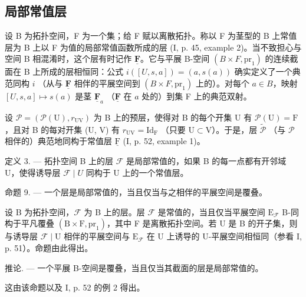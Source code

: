 \subsection{局部常值层}

设 B 为拓扑空间，F 为一个集；给 F 赋以离散拓扑。称以 F 为茎型的 B 上常值层为 B 上以 F 为值的局部常值函数所成的层 (I, p. 45, example 2)。当不致担心与空间 B 相混淆时，这个层有时记作 \(\underline{\mathbf{F}}\)。它与平展 B-空间 \((B \times F,\mathrm{pr}_1)\) 的连续截面在 B 上所成的层相恒同：公式 \(i([U,s,a]) = (a,s(a))\) 确实定义了一个典范同构 \(i\) （从与 \(\underline{\mathbf{F}}\) 相伴的平展空间到 \((B \times F,\mathrm{pr}_1)\) 上的）。对每个 \(a \in B\)，映射 \([U,s,a] \mapsto s(a)\) 是茎 \(\underline{\mathbf{F}}_a\) （\(\underline{\mathbf{F}}\) 在 \(a\) 处的）到集 F 上的典范双射。

设 \(\mathcal{P} = (\mathcal{P}(\mathrm{U}), r_{\mathrm{UV}})\) 为 B 上的预层，使得对 B 的每个开集 U 有 \(\mathcal{P}(\mathrm{U}) = \mathrm{F}\)，且对 B 的每对开集 (U, V) 有 \(r_{\mathrm{UV}} = \mathrm{Id}_{\mathrm{F}}\) （只要 \(\mathrm{U} \subset \mathrm{V}\)）。于是，层 \(\widetilde{\mathcal{P}}\) （与 \(\mathcal{P}\) 相伴的）典范地同构于常值层 \(\underline{\mathrm{F}}\) (I, p. 52, example 1)。

定义 3. --- 拓扑空间 B 上的层 \(\mathcal{F}\) 是局部常值的，如果 B 的每一点都有开邻域 U，使得诱导层 \(\mathcal{F} \mid U\) 同构于 U 上的一个常值层。

命题 9. --- 一个层是局部常值的，当且仅当与之相伴的平展空间是覆叠。

设 B 为拓扑空间，\(\mathcal{F}\) 为 B 上的层。层 \(\mathcal{F}\) 是常值的，当且仅当平展空间 \(\mathrm{E}_{\mathcal{F}}\) B-同构于平凡覆叠 \((\mathrm{B} \times \mathrm{F},\mathrm{pr}_1)\)，其中 F 是离散拓扑空间。若 U 是 B 的开子集，则与诱导层 \(\mathcal{F} \mid \mathrm{U}\) 相伴的平展空间与 \(\mathrm{E}_{\mathcal{F}}\) 在 U 上诱导的 U-平展空间相恒同（参看 I, p. 51）。命题由此得出。

推论. --- 一个平展 B-空间是覆叠，当且仅当其截面的层是局部常值的。

这由该命题以及 I, p. 52 的例 2 得出。

